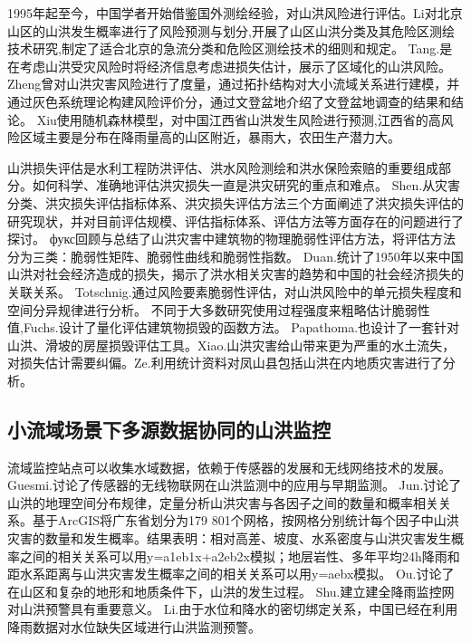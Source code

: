 \documentclass{ctexart}
\begin{document}
1995年起至今，中国学者开始借鉴国外测绘经验，对山洪风险进行评估。Li\cite{lixian1995torrent}对北京山区的山洪发生概率进行了风险预测与划分,开展了山区山洪分类及其危险区测绘技术研究,制定了适合北京的急流分类和危险区测绘技术的细则和规定。
Tang.\cite{tang2005gis}是在考虑山洪受灾风险时将经济信息考虑进损失估计，展示了区域化的山洪风险。
Zheng\cite{zheng2018study}曾对山洪灾害风险进行了度量，通过拓扑结构对大小流域关系进行建模，并通过灰色系统理论构建风险评价分，通过文登盆地介绍了文登盆地调查的结果和结论。
Xiu\cite{xiuqin2019risk}使用随机森林模型，对中国江西省山洪发生风险进行预测,江西省的高风险区域主要是分布在降雨量高的山区附近，暴雨大，农田生产潜力大。

山洪损失评估是水利工程防洪评估、洪水风险测绘和洪水保险索赔的重要组成部分。如何科学、准确地评估洪灾损失一直是洪灾研究的重点和难点。
Shen.\cite{shen2015progress}从灾害分类、洪灾损失评估指标体系、洪灾损失评估方法三个方面阐述了洪灾损失评估的研究现状，并对目前评估规模、评估指标体系、评估方法等方面存在的问题进行了探讨。
фукс\cite{фукс2020mountain}回顾与总结了山洪灾害中建筑物的物理脆弱性评估方法，将评估方法分为三类：脆弱性矩阵、脆弱性曲线和脆弱性指数。
Duan.\cite{duan2016floods}统计了1950年以来中国山洪对社会经济造成的损失，揭示了洪水相关灾害的趋势和中国的社会经济损失的关联关系。
Totschnig.\cite{totschnig2013mountain}通过风险要素脆弱性评估，对山洪风险中的单元损失程度和空间分异规律进行分析。
不同于大多数研究使用过程强度来粗略估计脆弱性值,Fuchs.\cite{fuchs2012quantitative}设计了量化评估建筑物损毁的函数方法。
Papathoma.\cite{papathoma2015loss}也设计了一套针对山洪、滑坡的房屋损毁评估工具。Xiao.\cite{xiaoyu2017potential}山洪灾害给山带来更为严重的水土流失，对损失估计需要纠偏。Ze.\cite{ze2007geology}利用统计资料对凤山县包括山洪在内地质灾害进行了分析。



\subsection{小流域场景下多源数据协同的山洪监控}

流域监控站点可以收集水域数据，依赖于传感器的发展和无线网络技术的发展。
Guesmi.\cite{guesmi2017wireless}讨论了传感器的无线物联网在山洪监测中的应用与早期监测。
Jun.\cite{jun2021geospatial}讨论了山洪的地理空间分布规律，定量分析山洪灾害与各因子之间的数量和概率相关关系。基于ArcGIS将广东省划分为179 801个网格，按网格分别统计每个因子中山洪灾害的数量和发生概率。结果表明：相对高差、坡度、水系密度与山洪灾害发生概率之间的相关关系可以用y=a1eb1x+a2eb2x模拟；地层岩性、多年平均24h降雨和距水系距离与山洪灾害发生概率之间的相关关系可以用y=aebx模拟。
Ou.\cite{ouyang2011construction}讨论了在山区和复杂的地形和地质条件下，山洪的发生过程。
Shu.\cite{shu2015discussion}建立建全降雨监控网对山洪预警具有重要意义。
Li.\cite{li2018flash}由于水位和降水的密切绑定关系，中国已经在利用降雨数据对水位缺失区域进行山洪监测预警。
\end{document}
